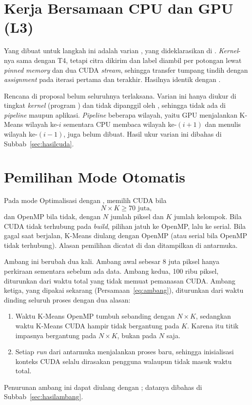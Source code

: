 \section{Kerja Bersamaan CPU dan GPU (L3)}
\label{sec:bersamaan}
Yang dibuat untuk langkah ini adalah varian , yang dideklarasikan di . \emph{Kernel}-nya sama dengan T4, tetapi citra dikirim dan label diambil per potongan lewat \emph{pinned memory} dan dua CUDA \emph{stream}, sehingga transfer tumpang tindih dengan \emph{assignment} pada iterasi pertama dan terakhir. Hasilnya identik dengan .

Rencana di proposal belum seluruhnya terlaksana. Varian ini hanya diukur di tingkat \emph{kernel} (program ) dan tidak dipanggil oleh , sehingga tidak ada di \emph{pipeline} maupun aplikasi. \emph{Pipeline} beberapa wilayah, yaitu GPU menjalankan K-Means wilayah ke-$i$ sementara CPU membaca wilayah ke-$(i+1)$ dan menulis wilayah ke-$(i-1)$, juga belum dibuat. Hasil ukur varian ini dibahas di Subbab~\ref{sec:hasilcuda}.

\section{Pemilihan Mode Otomatis}
\label{sec:otomatis}
Pada mode Optimalisasi dengan ,  memilih CUDA bila
\begin{equation}
    N \times K \geq 70 \text{ juta},
    \label{eq:ambang}
\end{equation}
dan OpenMP bila tidak, dengan $N$ jumlah piksel dan $K$ jumlah kelompok. Bila CUDA tidak terhubung pada \emph{build}, pilihan jatuh ke OpenMP, lalu ke serial. Bila  gagal saat berjalan, K-Means diulang dengan OpenMP (atau serial bila OpenMP tidak terhubung). Alasan pemilihan dicatat di  dan ditampilkan di antarmuka.

Ambang ini berubah dua kali. Ambang awal sebesar 8 juta piksel hanya perkiraan sementara sebelum ada data. Ambang kedua, 100 ribu piksel, diturunkan dari waktu total yang tidak memuat pemanasan CUDA. Ambang ketiga, yang dipakai sekarang (Persamaan~\ref{eq:ambang}), diturunkan dari waktu dinding seluruh proses dengan dua alasan:
\begin{enumerate}
    \item Waktu K-Means OpenMP tumbuh sebanding dengan $N \times K$, sedangkan waktu K-Means CUDA hampir tidak bergantung pada $K$. Karena itu titik impasnya bergantung pada $N \times K$, bukan pada $N$ saja.
    \item Setiap \emph{run} dari antarmuka menjalankan proses  baru, sehingga inisialisasi konteks CUDA selalu dirasakan pengguna walaupun tidak masuk waktu total.
\end{enumerate}
Penurunan ambang ini dapat diulang dengan ; datanya dibahas di Subbab~\ref{sec:hasilambang}.

